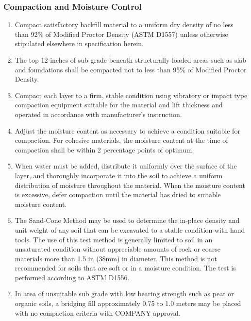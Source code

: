 \documentclass{article}%
\begin{document}
\subsubsection{Compaction and Moisture Control}%
\label{ssubsec:CompactionandMoistureControl}%
\begin{enumerate}[label=\alph*),start=1]%
\item%
Compact satisfactory backfill material to a uniform dry density of no less than 92\% of Modified Proctor Density (ASTM D1557) unless otherwise stipulated elsewhere in specification herein.%
\item%
The top 12{-}inches of sub grade beneath structurally loaded areas such as slab  and  foundations  shall  be  compacted not to  less  than  95\%  of Modified Proctor Density.%
\item%
Compact each layer to a firm, stable condition using vibratory or impact type compaction equipment suitable for the material and lift thickness and operated in accordance with manufacturer's instruction.%
\item%
Adjust the moisture content as necessary to achieve a condition suitable for compaction. For cohesive materials, the moisture content at the time of compaction shall be within 2 percentage points of optimum.%
\item%
When water must be added, distribute it uniformly over the surface of the layer, and thoroughly incorporate it into the soil to achieve a uniform distribution of moisture throughout the material.   When the moisture content is excessive, defer compaction until the material has dried to suitable moisture content.%
\item%
The Sand{-}Cone Method may be used to determine the in{-}place density and unit weight of any soil that can be excavated to a stable condition with hand tools. The use of this test method is generally limited to soil in an unsaturated condition without appreciable amounts of rock or coarse materials more than 1.5 in (38mm) in diameter. This method is not recommended for soils that are soft or in a moisture condition. The test is performed according to ASTM D1556.%
\item%
In area of unsuitable sub grade with low bearing strength such as peat or organic soils, a bridging fill approximately 0.75 to 1.0 meters may be placed with no compaction criteria with COMPANY approval.%
\end{enumerate}

%
\end{document}
